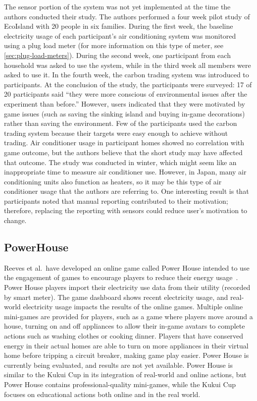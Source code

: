 The sensor portion of the system was not yet implemented at the time the authors conducted their study. The authors performed a four week pilot study of EcoIsland with 20 people in six families. During the first week, the baseline electricity usage of each participant's air conditioning system was monitored using a plug load meter (for more information on this type of meter, see \autoref{sec:plug-load-meters}). During the second week, one participant from each household was asked to use the system, while in the third week all members were asked to use it. In the fourth week, the carbon trading system was introduced to participants. At the conclusion of the study, the participants were surveyed: 17 of 20 participants said ``they were more conscious of environmental issues after the experiment than before.'' However, users indicated that they were motivated by game issues (such as saving the sinking island and buying in-game decorations) rather than saving the environment. Few of the participants used the carbon trading system because their targets were easy enough to achieve without trading. Air conditioner usage in participant homes showed no correlation with game outcome, but the authors believe that the short study may have affected that outcome. The study was conducted in winter, which might seem like an inappropriate time to measure air conditioner use. However, in Japan, many air conditioning units also function as heaters, so it may be this type of air conditioner usage that the authors are referring to. One interesting result is that participants noted that manual reporting contributed to their motivation; therefore, replacing the reporting with sensors could reduce user's motivation to change.


\subsection{PowerHouse}

Reeves et al.\ have developed an online game called Power House intended to use the engagement of games to encourage players to reduce their energy usage~\cite{Reeves2011powerhouse}. Power House players import their electricity use data from their utility (recorded by smart meter). The game dashboard shows recent electricity usage, and real-world electricity usage impacts the results of the online games. Multiple online mini-games are provided for players, such as a game where players move around a house, turning on and off appliances to allow their in-game avatars to complete actions such as washing clothes or cooking dinner. Players that have conserved energy in their actual homes are able to turn on more appliances in their virtual home before tripping a circuit breaker, making game play easier. Power House is currently being evaluated, and results are not yet available. Power House is similar to the Kukui Cup in its integration of real-world and online actions, but Power House contains professional-quality mini-games, while the Kukui Cup focuses on educational actions both online and in the real world.


